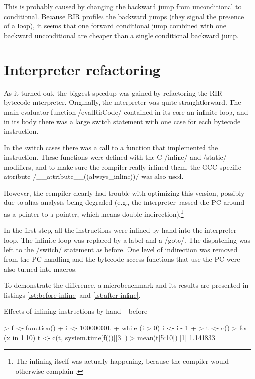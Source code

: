 This is probably caused by changing the backward jump from unconditional to conditional. Because RIR profiles the backward jumps (they signal the presence of a loop), it seems that one forward conditional jump combined with one backward unconditional are cheaper than a single conditional backward jump.


\section{Interpreter refactoring}

As it turned out, the biggest speedup was gained by refactoring the RIR bytecode interpreter. Originally, the interpreter was quite straightforward. The main evaluator function \cinline/evalRirCode/ contained in its core an infinite loop, and in its body there was a large switch statement with one case for each bytecode instruction.

In the switch cases there was a call to a function that implemented the instruction. These functions were defined with the C \cinline/inline/ and \cinline/static/ modifiers, and to make sure the compiler really inlined them, the GCC specific attribute \cinline/__attribute__((always_inline))/ was also used.

However, the compiler clearly had trouble with optimizing this version, possibly due to alias analysis being degraded (e.g., the interpreter passed the PC around as a pointer to a pointer, which means double indirection).\footnote{The inlining itself was actually happening, because the compiler would otherwise complain \autocite{gcc-inline}.}

In the first step, all the instructions were inlined by hand into the interpreter loop. The infinite loop was replaced by a label and a \cinline/goto/. The dispatching was left to the \cinline/switch/ statement as before. One level of indirection was removed from the PC handling and the bytecode access functions that use the PC were also turned into macros. 

To demonstrate the difference, a microbenchmark and its results are presented in listings \ref{lst:before-inline} and \ref{lst:after-inline}.

\begin{listing}[htbp]
  \caption{\label{lst:before-inline}Effects of inlining instructions by hand -- before}
  \begin{rcode}
> f <- function() {
+     i <- 10000000L
+     while (i > 0) i <- i - 1
+ }
> t <- c()
> for (x in 1:10) t <- c(t, system.time(f())[[3]])
> mean(t[5:10])
[1] 1.141833
  \end{rcode}
\end{listing}

